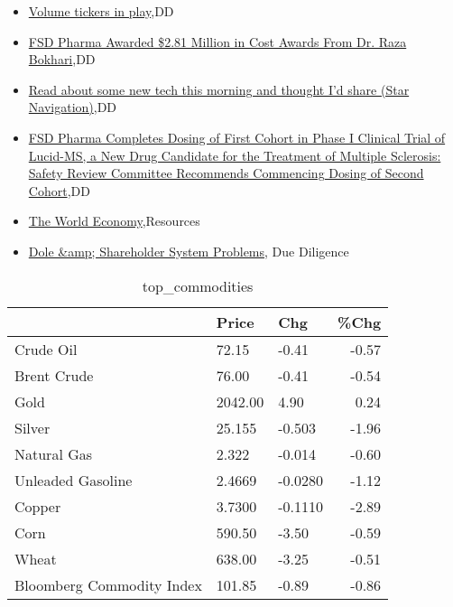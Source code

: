 \documentclass{article}%
\begin{document}
%
\begin{itemize}%
\item%
\href{https://reddit.com/r/wallstreetbets/comments/13elb4v/volume\_tickers\_in\_play/}{Volume tickers in play},DD%
\item%
\href{https://reddit.com/r/Baystreetbets/comments/13em9y5/fsd\_pharma\_awarded\_281\_million\_in\_cost\_awards/}{FSD Pharma Awarded \$2.81 Million in Cost Awards From Dr. Raza Bokhari},DD%
\item%
\href{https://reddit.com/r/Baystreetbets/comments/13dsbi6/read\_about\_some\_new\_tech\_this\_morning\_and\_thought/}{Read about some new tech this morning and thought I'd share (Star Navigation)},DD%
\item%
\href{https://reddit.com/r/Baystreetbets/comments/13do2ci/fsd\_pharma\_completes\_dosing\_of\_first\_cohort\_in/}{FSD Pharma Completes Dosing of First Cohort in Phase I Clinical Trial of Lucid-MS, a New Drug Candidate for the Treatment of Multiple Sclerosis: Safety Review Committee Recommends Commencing Dosing of Second Cohort},DD%
\item%
\href{https://reddit.com/r/StockMarket/comments/13e3jl3/the\_world\_economy/}{The World Economy},Resources%
\item%
\href{https://reddit.com/r/Superstonk/comments/13em2kv/dole\_shareholder\_system\_problems/}{Dole \&amp; Shareholder System Problems}, Due Diligence%
\end{itemize}%


\begin{table}[htbp]%
\caption{top\_commodities}%
\centering%
\begin{adjustbox}{width=1\textwidth}%
\begin{tabular}{lllr}
\toprule
                          &   Price &     Chg &  \%Chg \\
\midrule
               Crude Oil  &   72.15 &   -0.41 & -0.57 \\
             Brent Crude  &   76.00 &   -0.41 & -0.54 \\
                    Gold  & 2042.00 &    4.90 &  0.24 \\
                  Silver  &  25.155 &  -0.503 & -1.96 \\
             Natural Gas  &   2.322 &  -0.014 & -0.60 \\
       Unleaded Gasoline  &  2.4669 & -0.0280 & -1.12 \\
                  Copper  &  3.7300 & -0.1110 & -2.89 \\
                    Corn  &  590.50 &   -3.50 & -0.59 \\
                   Wheat  &  638.00 &   -3.25 & -0.51 \\
Bloomberg Commodity Index &  101.85 &   -0.89 & -0.86 \\
\bottomrule
\end{tabular}
%
\end{adjustbox}%
\end{table}
\end{document}
